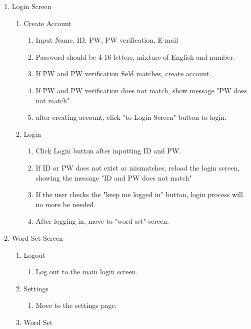\documentclass[conference]{IEEEtran}
\begin{document}
\begin{enumerate}
    \item Login Screen
    \begin{enumerate}
        \item Create Account
            \begin{enumerate}
                \item Input Name, ID, PW, PW verification, E-mail
                \item Password should be 4-16 letters, mixture of English and number.
                \item If PW and PW verification field matches, create account.
                \item If PW and PW verification does not match, show message "PW does not match".
                \item after creating account, click "to Login Screen" button to login.
            \end{enumerate}
        \item Login
            \begin{enumerate}
                \item Click Login button after inputting ID and PW.
                \item If ID or PW does not exist or mismatches, reload the login screen, showing the message "ID and PW does not match"
                \item If the user checks the "keep me logged in" button, login process will no more be needed.
                \item After logging in, move to "word set" screen.
            \end{enumerate}
    \end{enumerate}
    \item Word Set Screen
        \begin{enumerate}
            \item Logout
                \begin{enumerate}
                    \item Log out to the main login screen.
                \end{enumerate}
            \item Settings
                \begin{enumerate}
                    \item Move to the settings page.
                \end{enumerate}
            \item Word Set

\end{enumerate}
\end{enumerate}
\end{document}
